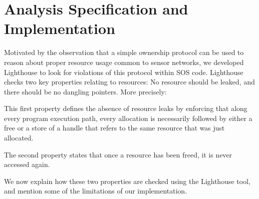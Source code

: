 \section{Analysis Specification and Implementation}
\label{sec:alg}

Motivated by the observation that a simple ownership protocol can be
used to reason about proper resource usage common to sensor networks,
we developed Lighthouse to look for violations of this protocol within
SOS code.  Lighthouse checks two key properties relating to resources:
No resource should be leaked, and there should be no dangling
pointers.  More precisely:

\smallskip{} This first property defines the
absence of resource leaks by enforcing that along every program
execution path, every allocation is necessarily followed by either a
free or a store of a handle that refers to the same resource that was
just allocated.

\smallskip{} The second property
states that once a resource has been freed, it is never accessed
again.

We now explain how these two properties are checked using the
Lighthouse tool, and mention some of the limitations of our implementation.

